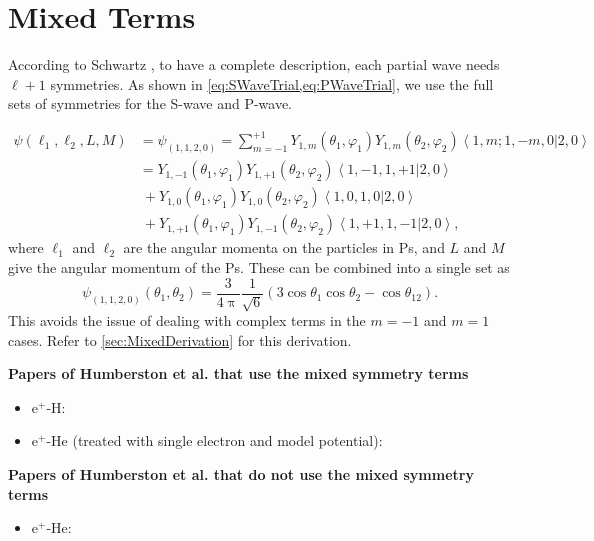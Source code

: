 \documentclass[Dissertation.tex]{subfiles}
\begin{document}
\section{Mixed Terms}
\label{sec:MixedTerms}

According to Schwartz \cite{Schwartz1961a}, to have a complete description, each partial wave needs $\ell+1$ symmetries. As shown in \cref{eq:SWaveTrial,eq:PWaveTrial}, we use the full sets of symmetries for the S-wave and P-wave.

\begin{align}
\label{eq:MixedAng}
\psi(\ell_1,\ell_2,L,M) &= \psi_{(1,1,2,0)} = \sum_{m=-1}^{+1} Y_{1,m}(\theta_1,\varphi_1) Y_{1,m}(\theta_2,\varphi_2) \left< 1,m; 1,-m,0 | 2,0 \right> \nonumber \\
	&= Y_{1,-1}(\theta_1,\varphi_1) Y_{1,+1}(\theta_2,\varphi_2)
    \left< 1,-1,1,+1 | 2,0 \right> \nonumber \\
& \  + Y_{1,0}(\theta_1,\varphi_1) Y_{1,0}(\theta_2,\varphi_2)
    \left< 1,0,1,0 | 2,0 \right> \nonumber \\
& \ + Y_{1,+1}(\theta_1,\varphi_1) Y_{1,-1}(\theta_2,\varphi_2)
   \left< 1,+1,1,-1 | 2,0 \right>,
\end{align}
where $\ell_1$ and $\ell_2$ are the angular momenta on the particles in Ps, and $L$ and $M$ give the angular momentum of the Ps.
These can be combined into a single set as
\begin{equation}
\label{eq:MixedAngSimple}
\psi_{(1,1,2,0)}(\theta_1,\theta_2) = \frac{3}{4\uppi} \frac{1}{\sqrt{6}} \left(3 \cos\theta_1 \cos\theta_2 - \cos\theta_{12} \right).
\end{equation}
This avoids the issue of dealing with complex terms in the $m = -1$ and $m = 1$ cases. Refer to \cref{sec:MixedDerivation} for this derivation.

\textbf{Papers of Humberston et al. that use the mixed symmetry terms}
\begin{itemize}
	\item e$^+$-H: \cite{Brown1985a,BrownThesis,WattsThesis,Humberston1997,VanReeth1997}
	\item e$^+$-He (treated with single electron and model potential): \cite{Dunn2000,DunnThesis}
\end{itemize}

\textbf{Papers of Humberston et al. that do not use the mixed symmetry terms}
\begin{itemize}
	\item e$^+$-He: \cite{VanReeth1997,VanReethThesis}
\end{itemize}
\end{document}
